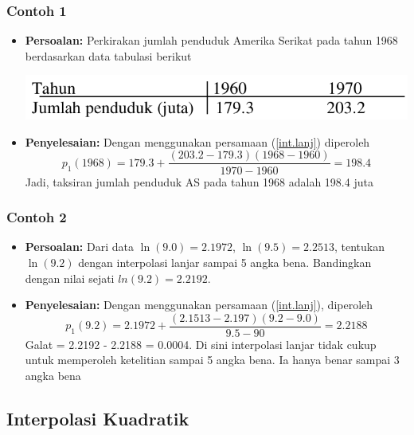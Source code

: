 \documentclass[pdflatex,compress,mathserif]{beamer}
\begin{document}
\begin{frame}
	\frametitle{Contoh 1}
	\begin{itemize}
		\item \textbf{Persoalan:} Perkirakan jumlah penduduk Amerika Serikat pada tahun 1968 berdasarkan data tabulasi berikut
		\begin{center}
			\includegraphics[width=0.8\linewidth]{img/img05}
		\end{center}
		\item \textbf{Penyelesaian:} Dengan menggunakan persamaan (\ref{int.lanj}) diperoleh
		\[ p_1(1968) = 179.3 + \frac{(203.2-179.3)(1968-1960)}{1970-1960} = 198.4 \]
		Jadi, taksiran jumlah penduduk AS pada tahun 1968 adalah 198.4 juta
	\end{itemize}
\end{frame}

\begin{frame}
	\frametitle{Contoh 2}
	\begin{itemize}
		\item \textbf{Persoalan:} Dari data $ \ln(9.0) = 2.1972 $, $ \ln(9.5) = 2.2513 $, tentukan $ \ln(9.2) $ dengan interpolasi lanjar sampai 5 angka bena. Bandingkan dengan nilai sejati $ ln(9.2) = 2.2192 $.
		\item \textbf{Penyelesaian:} Dengan menggunakan persamaan (\ref{int.lanj}), diperoleh
		\[ p_1(9.2) = 2.1972 + \frac{(2.1513-2.197)(9.2-9.0)}{9.5-90} = 2.2188 \]
		Galat = 2.2192 - 2.2188 = 0.0004. Di sini interpolasi lanjar tidak cukup untuk memperoleh ketelitian sampai 5 angka bena. Ia hanya benar sampai 3 angka bena
	\end{itemize}
\end{frame}

\subsection{Interpolasi Kuadratik}
\end{document}
